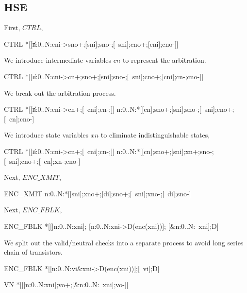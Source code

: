 \documentclass[aer.tex]{subfiles}
\begin{document}
\subsection{HSE}

First, $CTRL$,

\begin{hse}
CTRL\equiv
*[[\langle\|n:0..N:cni->sno+;[sni];sno-;[~sni];cno+;[cni];cno-\rangle]]
\end{hse}

We introduce intermediate variables $cn$ to represent the arbitration.

\begin{hse}
CTRL\equiv
*[[\langle\|n:0..N:cni->cn+;sno+;[sni];sno-;[~sni];cno+;[cni];cn-;cno-\rangle]]
\end{hse}

We break out the arbitration process.

\begin{hse}
CTRL\equiv
*[[\langle\|n:0..N:cni->cn+;[~cni];cn-;\rangle]] \pll
\langle\pll\!n:0..N:*[[cn];sno+;[sni];sno-;[~sni];cno+;[~cn];cno-]\rangle
\end{hse}

We introduce state variables $xn$ to eliminate indistinguishable states,

\begin{hse}
CTRL\equiv
*[[\langle\|n:0..N:cni->cn+;[~cni];cn-;\rangle]] \pll
\langle\pll\!n:0..N:*[[cn];sno+;[sni];xn+;sno-;[~sni];cno+;[~cn];xn-;cno-]\rangle
\end{hse}

Next, $ENC\_XMIT$,

\begin{hse}
ENC_XMIT\equiv
\langle\pll\!n:0..N:*[[sni];xno+;[di];sno+;[~sni];xno-;[~di];sno-]\rangle
\end{hse}

Next, $ENC\_FBLK$,

\begin{hse}
ENC_FBLK\equiv
*[[\langle|n:0..N:xni\rangle];
  [\langle[]n:0..N:xni->D(enc(xni))\Uparrow\rangle];
  [\langle&n:0..N:~xni\rangle];D\Downarrow]
\end{hse}

We split out the valid/neutral checks into a separate process to avoid long series chain of transistors.

\begin{hse}
ENC_FBLK\equiv
*[[\langle[]n:0..N:vi&xni->D(enc(xni))\Uparrow\rangle];[~vi];D\Downarrow]

VN\equiv
*[[\langle|n:0..N:xni\rangle];vo+;[\langle&n:0..N:~xni\rangle];vo-]]
\end{hse}
\end{document}
